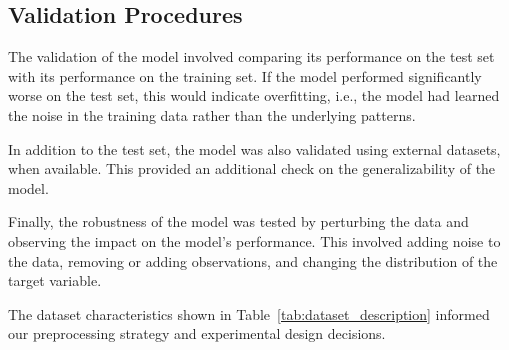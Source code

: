 \documentclass[conference]{IEEEtran}
\begin{document}
\subsection{Validation Procedures}
The validation of the model involved comparing its performance on the test set with its performance on the training set. If the model performed significantly worse on the test set, this would indicate overfitting, i.e., the model had learned the noise in the training data rather than the underlying patterns.

In addition to the test set, the model was also validated using external datasets, when available. This provided an additional check on the generalizability of the model.

Finally, the robustness of the model was tested by perturbing the data and observing the impact on the model's performance. This involved adding noise to the data, removing or adding observations, and changing the distribution of the target variable.

The dataset characteristics shown in Table~\ref{tab:dataset_description} informed our preprocessing strategy and experimental design decisions.
\end{document}
